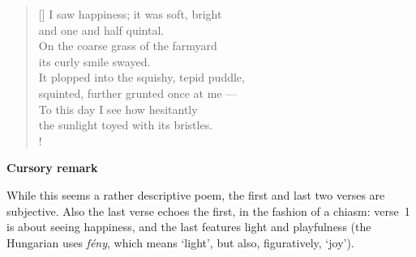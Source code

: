 \documentclass[a4paper,12pt,twoside,final]{book}
\begin{document}
\newpage


\settowidth{\versewidth}{It plopped into the squishy, tepid puddle,}

\begin{verse}[\versewidth]
  I saw happiness; it was soft, bright \\
  and one and half quintal. \\
  On the coarse grass of the farmyard \\
  its curly smile swayed. \\
  It plopped into the squishy, tepid puddle, \\
  squinted, further grunted once at me --- \\
  To this day I see how hesitantly \\
  the sunlight toyed with its bristles. \\!
\end{verse}


\bigskip

\noindent \textbf{Cursory remark}

\medskip

While this seems a rather descriptive poem, the first and last two
verses are subjective. Also the last verse echoes the first, in the
fashion of a chiasm: verse~1 is about seeing happiness, and the last
features light and playfulness (the Hungarian uses \emph{fény}, which
means `light', but also, figuratively, `joy').

\newpage

\settowidth{\versewidth}{hunyorgott, röffent még felém ---}
\end{document}
